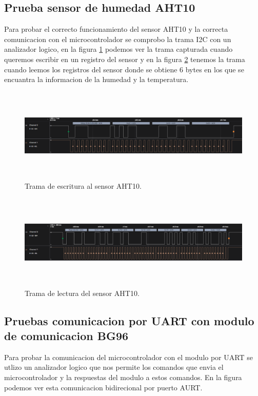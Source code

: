 \subsection{Prueba sensor de humedad AHT10}
Para probar el correcto funcionamiento del sensor AHT10 y la correcta comunicacion con el microcontrolador se comprobo la trama I2C con un analizador logico,
en la figura \ref{fig:write aht10} podemos ver la trama capturada cuando queremos escribir en un registro del sensor y en la figura \ref{fig:read aht10} tenemos la trama cuando leemos los registros del sensor donde se obtiene 6 bytes en los que se encuantra la informacion de la humedad y la temperatura. 

\begin{figure}[h!]
  \centering
    \includegraphics[width=\linewidth, height=4.5cm]{./Figures/write_i2c.png}
  \caption{Trama de escritura al sensor AHT10.}
    \label{fig:write aht10}
\end{figure}

\begin{figure}[h!]
  \centering
    \includegraphics[width=\linewidth, height=4.5cm]{./Figures/read_i2c..png}
  \caption{Trama de lectura del sensor AHT10.}
    \label{fig:read aht10}
\end{figure}

\subsection{Pruebas comunicacion por UART con modulo de comunicacion BG96}

Para probar la comunicacion del microcontrolador con el modulo por UART se utlizo un analizador logico que nos permite los comandos que envia el microcontrolador y la respuestas del modulo a estos comandos.
En la figura podemos ver esta comunicacion bidirecional por puerto AURT.

